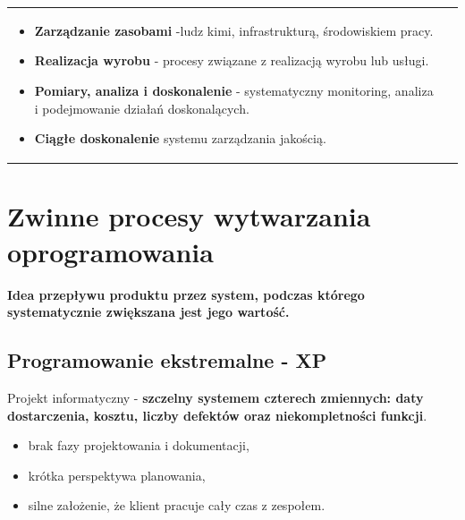 \documentclass[a4paper]{article}
\begin{document}
\begin{table}[H]
\begin{center}
\begin{tabular}{ p{7cm} | p{9cm}  }
\begin{itemize}
                    \item \textbf{Zarządzanie zasobami} -ludz kimi, infrastrukturą, środowiskiem pracy.

                    \item \textbf{Realizacja wyrobu} - procesy związane z realizacją wyrobu lub usługi.

                    \item  \textbf{Pomiary, analiza i doskonalenie} - systematyczny monitoring, analiza i
                    podejmowanie działań doskonalących.

                    \item \textbf{Ciągłe doskonalenie} systemu zarządzania jakością.
                \end{itemize}
                \\
            \end{tabular}
        \end{center}
    \end{table}


    \section{Zwinne procesy wytwarzania oprogramowania}


    \textbf{Idea przepływu produktu przez system, podczas którego systematycznie zwiększana jest jego wartość.}\\


    \subsection{Programowanie ekstremalne - XP}
    Projekt informatyczny - \textbf{szczelny systemem czterech zmiennych: daty dostarczenia, kosztu, liczby
    defektów oraz niekompletności funkcji}.

    \begin{itemize}
        \item brak fazy projektowania i dokumentacji,
        \item krótka perspektywa planowania,
        \item silne założenie, że klient pracuje cały czas z zespołem.
    \end{itemize}
\end{document}
